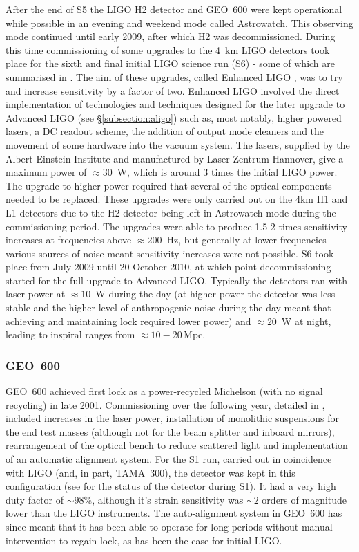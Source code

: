 \documentclass{article}
\begin{document}
After the end of S5 the LIGO H2 detector and GEO~600 were kept operational
while possible in an evening and weekend mode called Astrowatch. This
observing mode continued until early 2009, after which H2 was decommissioned.
During this time commissioning of some upgrades to the 4~km LIGO detectors took
place for the sixth and final initial LIGO science run (S6) - some of which are
summarised in \cite{Whitcomb:2008}. The aim of these upgrades, called Enhanced 
LIGO \cite{EnhancedLIGO}, was to try and  increase sensitivity by a factor of two. 
Enhanced LIGO involved the direct implementation of technologies and techniques 
designed for the later upgrade to Advanced LIGO (see \S\ref{subsection:aligo}) 
such as, most notably, higher powered lasers, a DC readout
scheme, the addition of output mode cleaners and the movement of some hardware
into the vacuum system. The lasers, supplied by the Albert Einstein Institute
and manufactured by Laser Zentrum Hannover, give a maximum power of $\approx30$~W, 
which is around 3 times the initial LIGO power. The upgrade to higher power required that
several of the optical components needed to be replaced. These upgrades were only
carried out on the 4km H1 and L1 detectors due to the H2 detector being
left in Astrowatch mode during the commissioning period. The upgrades were able 
to produce 1.5-2 times sensitivity increases at frequencies above $\approx 200$~Hz, 
but generally at lower frequencies various sources of noise meant sensitivity 
increases were not possible. S6 took place from July 2009 until 20 October 
2010, at which point decommissioning started for the full upgrade to Advanced LIGO. 
Typically the detectors ran with laser power at $\approx10$~W during the day (at
higher power the detector was less stable and the higher level of anthropogenic 
noise during the day meant that achieving and maintaining lock required lower
power) and $\approx 20$~W at night, leading to inspiral ranges from 
$\approx 10-20$\,Mpc.

\subsubsection{GEO~600}
GEO~600 achieved first lock as a power-recycled Michelson (with no signal
recycling) in late 2001. Commissioning over the following year, detailed in
\cite{Hewitson:2003}, included increases in the laser power, installation of
monolithic suspensions for the end test masses (although not for the beam
splitter and inboard mirrors), rearrangement of the optical bench to reduce
scattered light and implementation of an automatic alignment system. For the S1
run, carried out in coincidence with LIGO (and, in part, TAMA~300), the detector
was kept in this configuration (see \cite{Abbott:2004a} for the status of the
detector during S1). It had a very high duty factor of $\sim98\%$, although
it's strain sensitivity was $\sim2$ orders of magnitude lower than the LIGO
instruments. The auto-alignment system in GEO~600 has since meant that it has
been able to operate for long periods without manual intervention to regain
lock, as has been the case for initial LIGO.
\end{document}
